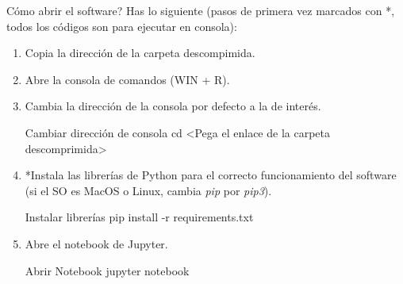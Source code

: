 \begin{frame}[t]{C\'omo abrir el software?}\vspace{-2pt}
Has lo siguiente (pasos de primera vez marcados con *, todos los c\'odigos son para ejecutar en consola):

\begin{enumerate}
	\item Copia la direcci\'on de la carpeta descompimida.
	\item Abre la consola de comandos (WIN + R).
	\item Cambia la direcci\'on de la consola por defecto a la de inter\'es.
	\begin{block}{Cambiar direcci\'on de consola}
		cd <Pega el enlace de la carpeta descomprimida>
	\end{block}
	\item *Instala las librer\'ias de Python para el correcto funcionamiento del software (si el SO es MacOS o Linux, cambia \textit{pip} por \textit{pip3}).
	\begin{block}{Instalar librer\'ias}
		pip install -r requirements.txt
	\end{block}
	\item Abre el notebook de Jupyter.
	\begin{block}{Abrir Notebook}
		jupyter notebook
	\end{block}
\end{enumerate}

\end{frame}